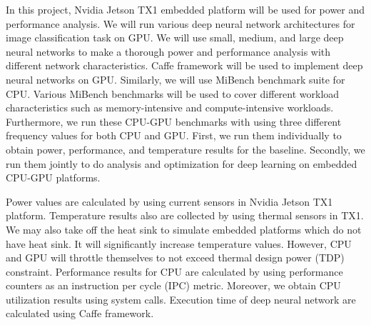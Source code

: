 In this project, Nvidia Jetson TX1 embedded platform will be used for power and performance analysis. We will run various deep neural network architectures for image classification task on GPU. We will use small, medium, and large deep neural networks to make a thorough power and performance analysis with different network characteristics. Caffe framework \cite{caffe} will be used to implement deep neural networks on GPU. Similarly, we will use MiBench benchmark suite for CPU. Various MiBench benchmarks will be used to cover different workload characteristics such as memory-intensive and compute-intensive workloads. Furthermore, we run these CPU-GPU benchmarks with using three different frequency values for both CPU and GPU. First, we run them individually to obtain power, performance, and temperature results for the baseline. Secondly, we run them jointly to do analysis and optimization for deep learning on embedded CPU-GPU platforms.

Power values are calculated by using current sensors in Nvidia Jetson TX1 platform. Temperature results also are collected by using thermal sensors in TX1. We may also take off the heat sink to simulate embedded platforms which do not have heat sink. It will significantly increase temperature values. However, CPU and GPU will throttle themselves to not exceed thermal design power (TDP) constraint. Performance results for CPU are calculated by using performance counters as an instruction per cycle (IPC) metric. Moreover, we obtain CPU utilization results using system calls. Execution time of deep neural network are calculated using Caffe framework.